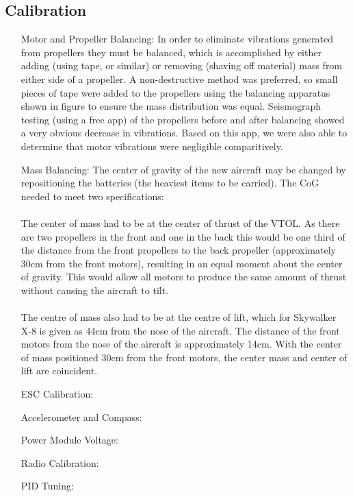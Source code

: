 \subsection{Calibration}
\begin{itemize}
	\item[Motor and Propeller Balancing:] In order to eliminate vibrations generated from propellers they must be balanced, which is accomplished by either adding (using tape, or similar) or removing (shaving off material) mass from either side of a propeller. A non-destructive method was preferred, so small pieces of tape were added to the propellers using the balancing apparatus shown in figure  to ensure the mass distribution was equal.  Seismograph testing (using a free app) of the propellers before and after balancing showed a very obvious decrease in vibrations. Based on this app, we were also able to determine that motor vibrations were negligible comparitively.
	\item[Mass Balancing:]  The center of gravity of the new aircraft may be changed by repositioning the batteries (the heaviest items to be carried). The CoG needed to meet two specifications:
	\\\\The center of mass had to be at the center of thrust of the VTOL. As there are two propellers in the front and one in the back this would be one third of the distance from the front propellers to the back propeller (approximately 30cm from the front motors), resulting in an equal moment about the center of gravity. This would allow all motors to produce the same amount of thrust without causing the aircraft to tilt.
	\\\\The centre of mass also had to be at the centre of lift, which for Skywalker X-8 is given as 44cm from the nose of the aircraft. The distance of the front motors from the nose of the aircraft is approximately 14cm. With the center of mass positioned 30cm from the front motors, the center mass and center of lift are coincident.
	\item[ESC Calibration:]
	\item[Accelerometer and Compass:]
	\item[Power Module Voltage:]
	\item[Radio Calibration:]
	\item[PID Tuning:]
		
\end{itemize}

